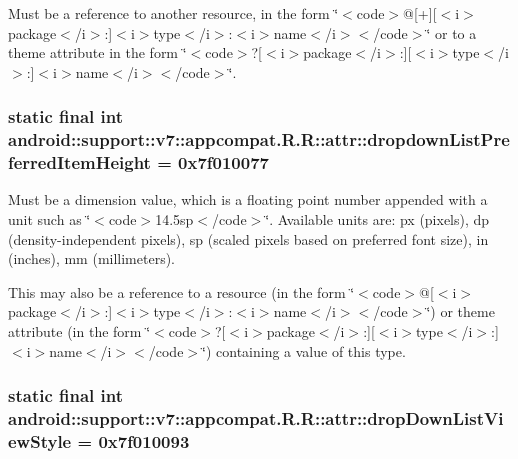 Must be a reference to another resource, in the form \char`\"{}$<$code$>$@\mbox{[}+\mbox{]}\mbox{[}$<$i$>$package$<$/i$>$:\mbox{]}$<$i$>$type$<$/i$>$:$<$i$>$name$<$/i$>$$<$/code$>$\char`\"{} or to a theme attribute in the form \char`\"{}$<$code$>$?\mbox{[}$<$i$>$package$<$/i$>$:\mbox{]}\mbox{[}$<$i$>$type$<$/i$>$:\mbox{]}$<$i$>$name$<$/i$>$$<$/code$>$\char`\"{}. \hypertarget{classandroid_1_1support_1_1v7_1_1appcompat_1_1_r_1_1attr_c21011101e53b38d6e260f907a576eba}{
\subsubsection[{dropdownListPreferredItemHeight}]{\setlength{\rightskip}{0pt plus 5cm}static final int android::support::v7::appcompat.R.R::attr::dropdownListPreferredItemHeight = 0x7f010077}}
\label{classandroid_1_1support_1_1v7_1_1appcompat_1_1_r_1_1attr_c21011101e53b38d6e260f907a576eba}


Must be a dimension value, which is a floating point number appended with a unit such as \char`\"{}$<$code$>$14.5sp$<$/code$>$\char`\"{}. Available units are: px (pixels), dp (density-independent pixels), sp (scaled pixels based on preferred font size), in (inches), mm (millimeters). 

This may also be a reference to a resource (in the form \char`\"{}$<$code$>$@\mbox{[}$<$i$>$package$<$/i$>$:\mbox{]}$<$i$>$type$<$/i$>$:$<$i$>$name$<$/i$>$$<$/code$>$\char`\"{}) or theme attribute (in the form \char`\"{}$<$code$>$?\mbox{[}$<$i$>$package$<$/i$>$:\mbox{]}\mbox{[}$<$i$>$type$<$/i$>$:\mbox{]}$<$i$>$name$<$/i$>$$<$/code$>$\char`\"{}) containing a value of this type. \hypertarget{classandroid_1_1support_1_1v7_1_1appcompat_1_1_r_1_1attr_dc1cf6c3f3c6407c24abba8b0296a71a}{
\subsubsection[{dropDownListViewStyle}]{\setlength{\rightskip}{0pt plus 5cm}static final int android::support::v7::appcompat.R.R::attr::dropDownListViewStyle = 0x7f010093}}
\label{classandroid_1_1support_1_1v7_1_1appcompat_1_1_r_1_1attr_dc1cf6c3f3c6407c24abba8b0296a71a}


